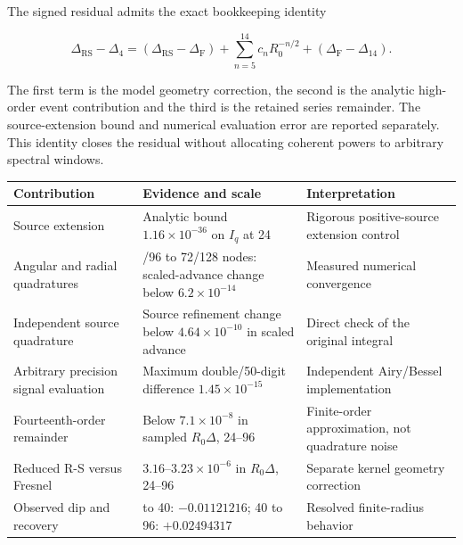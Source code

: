 \documentclass[11pt]{article}
\begin{document}
The signed residual admits the exact bookkeeping identity

\[\Delta_{\mathrm{RS}}-\Delta_4=(\Delta_{\mathrm{RS}}-\Delta_{\mathrm F})+\sum_{n=5}^{14}c_nR_0^{-n/2}+(\Delta_{\mathrm F}-\Delta_{14}).\]

The first term is the model geometry correction, the second is the
analytic high-order event contribution and the third is the retained
series remainder. The source-extension bound and numerical evaluation
error are reported separately. This identity closes the residual without
allocating coherent powers to arbitrary spectral windows.

\begin{longtable}[]{@{}
  >{\raggedright\arraybackslash}p{}
  >{\raggedright\arraybackslash}p{}
  >{\raggedright\arraybackslash}p{}@{}}
\toprule\noalign{}
\begin{minipage}[b]{\linewidth}\raggedright
Contribution
\end{minipage} & \begin{minipage}[b]{\linewidth}\raggedright
Evidence and scale
\end{minipage} & \begin{minipage}[b]{\linewidth}\raggedright
Interpretation
\end{minipage} \\
\midrule\noalign{}
\endhead
\bottomrule\noalign{}
\endlastfoot
Source extension & Analytic bound \(1.16\times10^{-36}\) on \(I_q\) at
24 & Rigorous positive-source extension control \\
Angular and radial quadratures & 48/96 to 72/128 nodes: scaled-advance
change below \(6.2\times10^{-14}\) & Measured numerical convergence \\
Independent source quadrature & Source refinement change below
\(4.64\times10^{-10}\) in scaled advance & Direct check of the original
integral \\
Arbitrary precision signal evaluation & Maximum double/50-digit
difference \(1.45\times10^{-15}\) & Independent Airy/Bessel
implementation \\
Fourteenth-order remainder & Below \(7.1\times10^{-8}\) in sampled
\(R_0\Delta\), 24--96 & Finite-order approximation, not quadrature
noise \\
Reduced R-S versus Fresnel & \(3.16\)--\(3.23\times10^{-6}\) in
\(R_0\Delta\), 24--96 & Separate kernel geometry correction \\
Observed dip and recovery & 24 to 40: \(-0.01121216\); 40 to 96:
\(+0.02494317\) & Resolved finite-radius behavior \\
\end{longtable}
\end{document}
